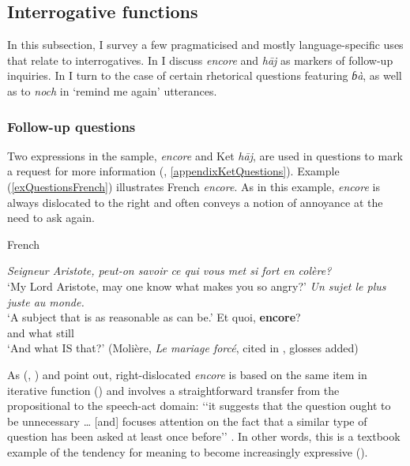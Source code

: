 \subsection{Interrogative functions}\label{sectionInterrogative}
In this subsection, I survey a few pragmaticised and mostly language-specific uses that relate to interrogatives. In  I discuss  \textit{encore} and  \textit{hāj} as markers of follow-up inquiries. In  I turn to the case of certain rhetorical questions featuring  \textit{ɓà}, as well as to  \textit{noch} in \lq remind me again\rq{ }utterances.

\subsubsection{Follow-up questions}\label{sectionFollowUpQuestions}
Two expressions in the sample,  \textit{encore} and Ket \textit{hāj}, are used in questions to mark a request for more information
(, \ref{appendixKetQuestions}). Example (\ref{exQuestionsFrench}) illustrates French \textit{encore}. As in this example, \textit{encore} is always dislocated to the right and often conveys a notion of annoyance at the need to ask again.

\begin{exe}
	\ex French\label{exQuestionsFrench}
	\begin{xlist}
		\textit{Seigneur Aristote, peut-on savoir ce qui vous met si fort en colère?}\\
		\lq My Lord Aristote, may one know what makes you so angry?'
		\textit{Un sujet le plus juste au monde.}\\
		\lq A subject that is as reasonable as can be.'
		 \gll Et quoi, \textbf{encore}?\\
		and what still\\
		\glt \lq And what IS that?' (Molière, \textit{Le mariage forcé}, cited in \cite[214]{MosegaardHansen2008}, glosses added)
	\end{xlist}
\end{exe}

 As \citeauthor{MosegaardHansen2002} (\citeyear{MosegaardHansen2002}, \citeyear[214]{MosegaardHansen2008}) and \textcite{Vaelikangas1982} point out, right-dislocated \textit{encore} is based on the same item in iterative function () and involves a straightforward transfer from the propositional to the speech-act domain: \lq\lq it suggests that the question ought to be unnecessary … [and] focuses attention on the fact that a similar type of question has been asked at least once before\rq\rq{ }\parencite[214]{MosegaardHansen2008}. In other words, this is a textbook example of the tendency for meaning to become increasingly expressive (). 


